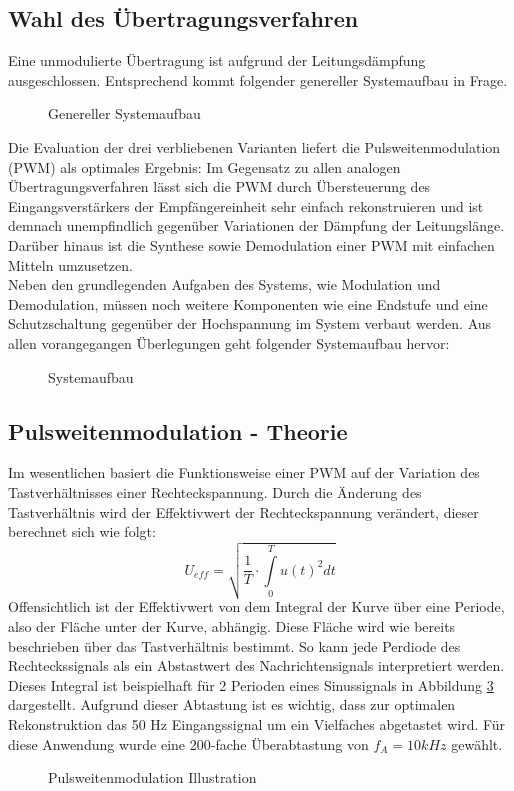 \subsection{Wahl des Übertragungsverfahren}
Eine unmodulierte Übertragung ist aufgrund der Leitungsdämpfung ausgeschlossen. Entsprechend kommt folgender genereller Systemaufbau in Frage.
\begin{figure}[H]
\centering
  
  \caption{Genereller Systemaufbau}
  \label{fig:psystem}
\end{figure}
Die Evaluation der drei verbliebenen Varianten liefert die Pulsweitenmodulation (PWM) als optimales Ergebnis:
Im Gegensatz zu allen analogen Übertragungsverfahren lässt sich die PWM durch Übersteuerung des Eingangsverstärkers der Empfängereinheit sehr einfach rekonstruieren und ist demnach unempfindlich gegenüber Variationen der Dämpfung der Leitungslänge. Darüber hinaus ist die Synthese sowie Demodulation einer PWM mit einfachen Mitteln umzusetzen.\\
Neben den grundlegenden Aufgaben des Systems, wie Modulation und Demodulation, müssen noch weitere Komponenten wie eine Endstufe und eine Schutzschaltung gegenüber der Hochspannung im System verbaut werden. 
Aus allen vorangegangen Überlegungen geht folgender Systemaufbau hervor: 
\begin{figure}[H]
  \centering
  
  \caption{Systemaufbau}
  \label{fig:system}
\end{figure}

\subsection{Pulsweitenmodulation - Theorie}
Im wesentlichen basiert die Funktionsweise einer PWM auf der Variation des Tastverhältnisses einer Rechteckspannung. Durch die Änderung des Tastverhältnis wird der Effektivwert der Rechteckspannung verändert, dieser berechnet sich wie folgt:\\
\begin{equation}
 U_{eff} = \sqrt{\frac{1}{T}\cdot\int\limits_{0}^T u(t)^2 dt}
\end{equation}
Offensichtlich ist der Effektivwert von dem Integral der Kurve über eine Periode, also der Fläche unter der Kurve, abhängig. Diese Fläche wird wie bereits beschrieben über das Tastverhältnis bestimmt. So kann jede Perdiode des Rechteckssignals als ein Abstastwert des Nachrichtensignals interpretiert werden. Dieses Integral ist beispielhaft für 2 Perioden eines Sinussignals in Abbildung \ref{fig:pwmArea} dargestellt. Aufgrund dieser Abtastung ist es wichtig, dass zur optimalen Rekonstruktion das 50 Hz Eingangssignal um ein Vielfaches abgetastet wird. Für diese Anwendung wurde eine 200-fache Überabtastung von $f_A=10kHz$ gewählt.
\begin{figure}[H]
  \centering
   \scalebox{0.6}{\begin{Large}
   
   \end{Large}}
   \caption{Pulsweitenmodulation Illustration}
  \label{fig:pwmArea}
\end{figure}

\newpage
